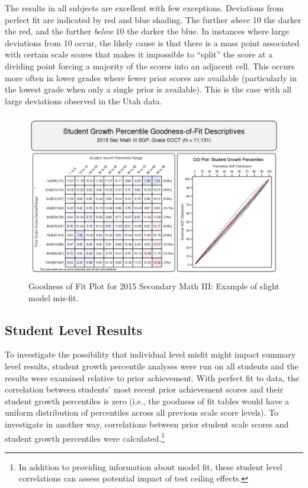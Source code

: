 \documentclass[12pt]{article}
\begin{document}
The results in all subjects are excellent with few exceptions.
Deviations from perfect fit are indicated by red and blue shading. The
further \emph{above} 10 the darker the red, and the further \emph{below}
10 the darker the blue. In instances where large deviations from 10
occur, the likely cause is that there is a mass point associated with
certain scale scores that makes it impossible to ``split'' the score at
a dividing point forcing a majority of the scores into an adjacent cell.
This occurs more often in lower grades where fewer prior scores are
available (particularly in the lowest grade when only a single prior is
available). This is the case with all large deviations observed in the
Utah data.

\begin{figure}[htbp]
\centering
\includegraphics{../img/Goodness_of_Fit/SEC_MATH_III.2015/gofSGP_SEC_III.png}
\caption{Goodness of Fit Plot for 2015 Secondary Math III: Example of
slight model mis-fit.}
\end{figure}

\pagebreak

\subsection{Student Level Results}\label{student-level-results}

To investigate the possibility that individual level misfit might impact
summary level results, student growth percentile analyses were run on
all students and the results were examined relative to prior
achievement. With perfect fit to data, the correlation between students'
most recent prior achievement scores and their student growth
percentiles is zero (i.e., the goodness of fit tables would have a
uniform distribution of percentiles across all previous scale score
levels). To investigate in another way, correlations between prior
student scale scores and student growth percentiles were
calculated.\footnote{In addition to providing information about model
  fit, these student level correlations can assess potential impact of
  test ceiling effects.}
\end{document}
